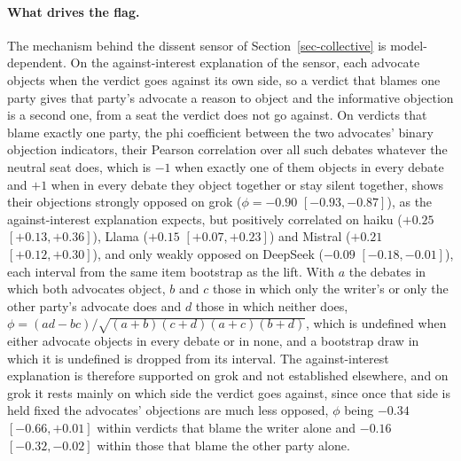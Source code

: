 \paragraph{What drives the flag.}
The mechanism behind the dissent sensor of Section~\ref{sec-collective} is
model-dependent. On the against-interest explanation of the sensor, each advocate
objects when the verdict goes against its own side, so a verdict that blames
one party gives that party's advocate a reason to object and the informative
objection is a second one, from a seat the verdict does not go against.
On verdicts that blame exactly one party, the phi coefficient
between the two advocates' binary objection indicators, their Pearson
correlation over all such debates whatever the neutral seat does, which is
$-1$ when exactly one of them objects in every debate and $+1$ when in every
debate they object together or stay silent together, shows their objections strongly opposed on grok
($\phi = -0.90$ $[-0.93, -0.87]$), as the against-interest explanation expects,
but positively correlated on haiku
($+0.25$ $[+0.13, +0.36]$), Llama ($+0.15$ $[+0.07, +0.23]$) and Mistral
($+0.21$ $[+0.12, +0.30]$), and only weakly opposed on DeepSeek ($-0.09$
$[-0.18, -0.01]$), each interval from the same item bootstrap as the lift.
With $a$ the debates in which both advocates object, $b$ and $c$ those in
which only the writer's or only the other party's advocate does and $d$ those
in which neither does, $\phi = (ad - bc)/\sqrt{(a+b)(c+d)(a+c)(b+d)}$, which
is undefined when either advocate objects in every debate or in none, and a
bootstrap draw in which it is undefined is dropped from its interval.
The against-interest explanation is therefore supported on grok and not
established elsewhere, and on grok it rests mainly on which side the verdict
goes against, since once that side is held fixed the advocates' objections
are much less opposed, $\phi$ being $-0.34$ $[-0.66, +0.01]$ within verdicts
that blame the writer alone and $-0.16$ $[-0.32, -0.02]$ within those that
blame the other party alone.
